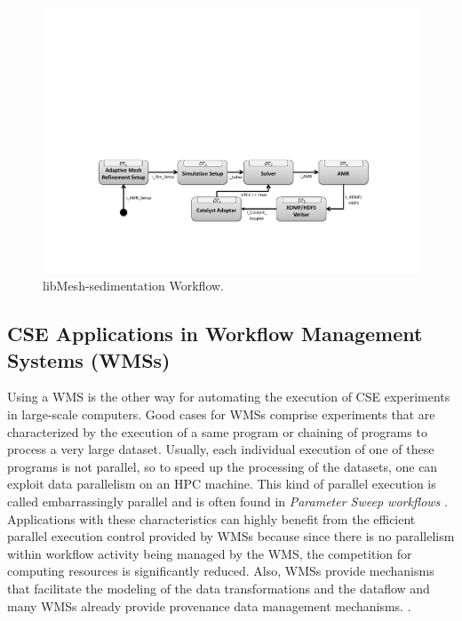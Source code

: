 \begin{figure}[H]
    \centering
    \includegraphics[width=\textwidth,keepaspectratio]{img/libMesh-workflow.pdf}
    \caption{libMesh-sedimentation Workflow.}
    \label{fig:libmesh}
\end{figure}




\subsection{CSE Applications in Workflow Management Systems (WMSs)}
\label{subsec_blackbox}

Using a WMS is the other way for automating the execution of CSE experiments in large-scale computers. Good cases for WMSs
comprise experiments that are characterized by the execution of a same program or chaining of programs to process a very large dataset. Usually, each individual execution of one of these programs is not parallel, so to speed up the processing of the datasets, one can exploit data parallelism on an HPC machine. This kind of parallel execution is called embarrassingly parallel and is often found in \textit{Parameter Sweep workflows} \cite{F.daSilva2017characterization}.
Applications with these characteristics can highly benefit from the
efficient parallel execution control provided by WMSs because since there is no parallelism within workflow activity being managed by the WMS, the competition for computing resources is significantly reduced.
Also, WMSs provide mechanisms that facilitate the modeling of the data transformations and the dataflow and many WMSs already provide provenance data management mechanisms. \cite{Mattoso2015Dynamic}.

